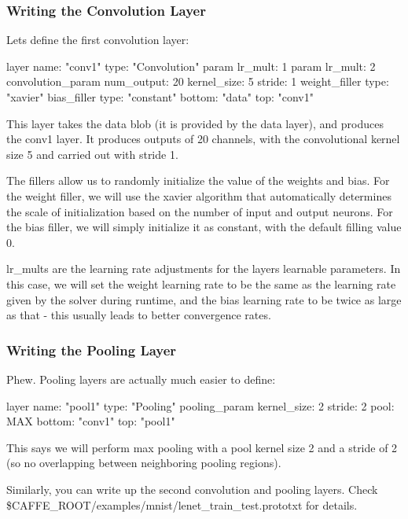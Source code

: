 \subsubsection*{Writing the Convolution Layer}

Let\textquotesingle{}s define the first convolution layer\+: \begin{DoxyVerb}layer {
  name: "conv1"
  type: "Convolution"
  param { lr_mult: 1 }
  param { lr_mult: 2 }
  convolution_param {
    num_output: 20
    kernel_size: 5
    stride: 1
    weight_filler {
      type: "xavier"
    }
    bias_filler {
      type: "constant"
    }
  }
  bottom: "data"
  top: "conv1"
}
\end{DoxyVerb}


This layer takes the {\ttfamily data} blob (it is provided by the data layer), and produces the {\ttfamily conv1} layer. It produces outputs of 20 channels, with the convolutional kernel size 5 and carried out with stride 1.

The fillers allow us to randomly initialize the value of the weights and bias. For the weight filler, we will use the {\ttfamily xavier} algorithm that automatically determines the scale of initialization based on the number of input and output neurons. For the bias filler, we will simply initialize it as constant, with the default filling value 0.

{\ttfamily lr\+\_\+mult}s are the learning rate adjustments for the layer\textquotesingle{}s learnable parameters. In this case, we will set the weight learning rate to be the same as the learning rate given by the solver during runtime, and the bias learning rate to be twice as large as that -\/ this usually leads to better convergence rates.

\subsubsection*{Writing the Pooling Layer}

Phew. Pooling layers are actually much easier to define\+: \begin{DoxyVerb}layer {
  name: "pool1"
  type: "Pooling"
  pooling_param {
    kernel_size: 2
    stride: 2
    pool: MAX
  }
  bottom: "conv1"
  top: "pool1"
}
\end{DoxyVerb}


This says we will perform max pooling with a pool kernel size 2 and a stride of 2 (so no overlapping between neighboring pooling regions).

Similarly, you can write up the second convolution and pooling layers. Check {\ttfamily \$\+C\+A\+F\+F\+E\+\_\+\+R\+O\+OT/examples/mnist/lenet\+\_\+train\+\_\+test.prototxt} for details.


